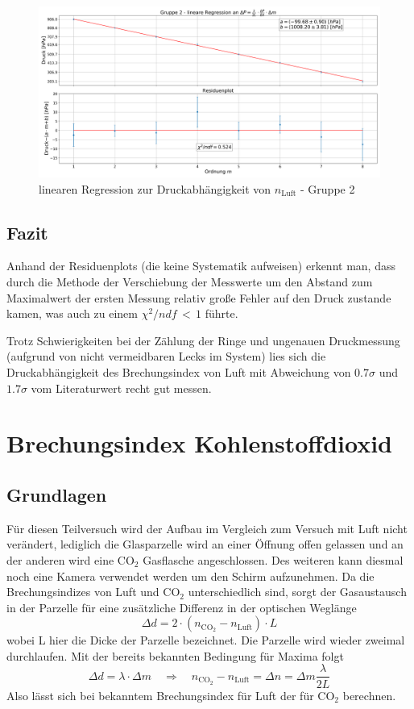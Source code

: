 \documentclass[a4paper, 11pt]{article}
\begin{document}
\begin{figure}[H]
	\centering
	\includegraphics[scale=0.3]{./Bilder/Gruppe2_linReg.png}
	\caption{linearen Regression zur Druckabhängigkeit von $n_{\mathrm{Luft}}$ - Gruppe 2}
	\label{pic:linReg2}	
\end{figure}

\subsection{Fazit}
Anhand der Residuenplots (die keine Systematik aufweisen) erkennt man, dass durch die Methode der Verschiebung der Messwerte um den Abstand zum Maximalwert der ersten Messung relativ große Fehler auf den Druck zustande kamen, was auch zu einem $\chi^2/ndf \, < \, 1$ führte.

Trotz Schwierigkeiten bei der Zählung der Ringe und ungenauen Druckmessung (aufgrund von nicht vermeidbaren Lecks im System) lies sich die Druckabhängigkeit des Brechungsindex von Luft mit Abweichung von $0.7\sigma$ und $1.7\sigma$ vom Literaturwert recht gut messen.

\clearpage
\section{Brechungsindex Kohlenstoffdioxid}
\subsection{Grundlagen}
Für diesen Teilversuch wird der Aufbau im Vergleich zum Versuch mit Luft nicht verändert, lediglich die Glasparzelle wird an einer Öffnung offen gelassen und an der anderen wird eine $\mathrm{CO_2}$ Gasflasche angeschlossen. Des weiteren kann diesmal noch eine Kamera verwendet werden um den Schirm aufzunehmen. Da die Brechungsindizes von Luft und $\mathrm{CO_2}$ unterschiedlich sind, sorgt der Gasaustausch in der Parzelle für eine zusätzliche Differenz in der optischen Weglänge
\begin{equation}
\Delta d=2\cdot (n_{\mathrm{CO_2}}-n_{\mathrm{Luft}}) \cdot L\end{equation}
wobei L hier die Dicke der Parzelle bezeichnet. Die Parzelle wird wieder zweimal durchlaufen.
Mit der bereits bekannten Bedingung für Maxima folgt
\begin{equation}
\Delta d= \lambda \cdot \Delta m
\quad \Rightarrow \quad 
n_{\mathrm{CO_2}}-n_{\mathrm{Luft}}=\Delta n= \Delta m \frac{\lambda}{2L}
\end{equation}
Also lässt sich bei bekanntem Brechungsindex für Luft der für $\mathrm{CO_2}$ berechnen.
\end{document}
